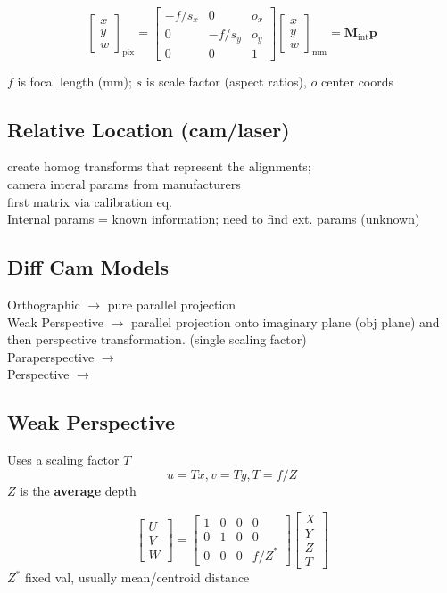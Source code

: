 \documentclass{article}
\begin{document}
\[
  \begin{bmatrix}
    x \\ y \\ w
  \end{bmatrix}_{\mathrm{pix}}
  =
  \begin{bmatrix}
    -f/s_x & 0 & o_x \\
    0 & -f/s_y & o_y \\
    0 & 0 & 1
  \end{bmatrix}
  \begin{bmatrix}
    x \\ y \\ w
  \end{bmatrix}_{\mathrm{mm}} = \mathbf M_{\mathrm{int}}\mathbf p
\]
\begin{expln}
  {}{}
  $f$ is focal length (mm); $s$ is scale factor (aspect ratios), $o$ center coords
\end{expln}


\subsection{Relative Location (cam/laser)}
create homog transforms that represent the alignments;\\
camera interal params from manufacturers\\
first matrix via calibration eq.\\
Internal params = known information; need to find ext. params (unknown)


\subsection{Diff Cam Models}
Orthographic $\to$ pure parallel projection\\
Weak Perspective $\to$ parallel projection onto imaginary plane (obj plane)
and then perspective transformation. (single scaling factor)
\\
Paraperspective $\to$ 
\\
Perspective $\to$

\subsection{Weak Perspective}
Uses a scaling factor $T$
\[
  u = Tx, v = Ty, T=f/Z
\]
$Z$ is the \textbf{average} depth

\[
  \begin{bmatrix}
    U \\ V\\ W
  \end{bmatrix} =
  \begin{bmatrix}
    1 & 0 & 0 & 0
    \\
    0 & 1 & 0 & 0\\
    0 & 0 & 0 & f/Z^*
  \end{bmatrix}
  \begin{bmatrix}
    X \\ Y \\ Z \\ T
  \end{bmatrix}
\]
$Z^*$ fixed val, usually mean/centroid distance
\end{document}
